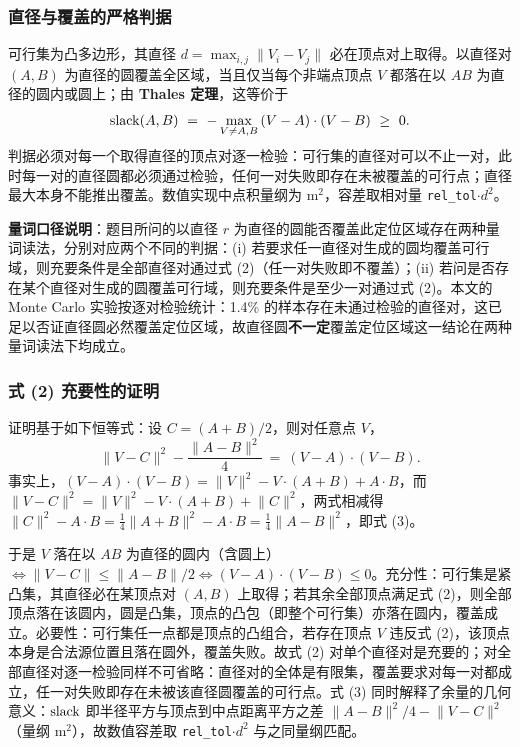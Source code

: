 \documentclass[12pt,a4paper]{ctexart}
\begin{document}
\subsubsection{直径与覆盖的严格判据}

可行集为凸多边形，其直径 $d=\max_{i,j}\lVert V_i-V_j\rVert$ 必在顶点对上取得。以直径对 $(A,B)$ 为直径的圆覆盖全区域，当且仅当每个非端点顶点 $V$ 都落在以 $AB$ 为直径的圆内或圆上；由 \textbf{Thales 定理}，这等价于
\begin{equation}
  \operatorname{slack}(A,B)\ =\ -\max_{V\neq A,B}\,(V-A)\cdot(V-B)\ \ge\ 0 .
\end{equation}
判据必须对每一个取得直径的顶点对逐一检验：可行集的直径对可以不止一对，此时每一对的直径圆都必须通过检验，任何一对失败即存在未被覆盖的可行点；直径最大本身不能推出覆盖。数值实现中点积量纲为 m$^2$，容差取相对量 \verb|rel_tol|$\cdot d^2$。

\textbf{量词口径说明}：题目所问的以直径 $r$ 为直径的圆能否覆盖此定位区域存在两种量词读法，分别对应两个不同的判据：(i) 若要求任一直径对生成的圆均覆盖可行域，则充要条件是全部直径对通过式 (2)（任一对失败即不覆盖）；(ii) 若问是否存在某个直径对生成的圆覆盖可行域，则充要条件是至少一对通过式 (2)。本文的 Monte Carlo 实验按逐对检验统计：1.4\% 的样本存在未通过检验的直径对，这已足以否证直径圆必然覆盖定位区域，故直径圆\textbf{不一定}覆盖定位区域这一结论在两种量词读法下均成立。

\subsubsection{式 (2) 充要性的证明}

证明基于如下恒等式：设 $C=(A+B)/2$，则对任意点 $V$，
\begin{equation}
  \lVert V-C\rVert^{2}-\frac{\lVert A-B\rVert^{2}}{4}\ =\ (V-A)\cdot(V-B).
\end{equation}
事实上，$(V-A)\cdot(V-B)=\lVert V\rVert^{2}-V\cdot(A+B)+A\cdot B$，而 $\lVert V-C\rVert^{2}=\lVert V\rVert^{2}-V\cdot(A+B)+\lVert C\rVert^{2}$，两式相减得 $\lVert C\rVert^{2}-A\cdot B=\tfrac14\lVert A+B\rVert^{2}-A\cdot B=\tfrac14\lVert A-B\rVert^{2}$，即式 (3)。

于是 $V$ 落在以 $AB$ 为直径的圆内（含圆上）$\iff \lVert V-C\rVert\le\lVert A-B\rVert/2 \iff (V-A)\cdot(V-B)\le 0$。充分性：可行集是紧凸集，其直径必在某顶点对 $(A,B)$ 上取得；若其余全部顶点满足式 (2)，则全部顶点落在该圆内，圆是凸集，顶点的凸包（即整个可行集）亦落在圆内，覆盖成立。必要性：可行集任一点都是顶点的凸组合，若存在顶点 $V$ 违反式 (2)，该顶点本身是合法源位置且落在圆外，覆盖失败。故式 (2) 对单个直径对是充要的；对全部直径对逐一检验同样不可省略：直径对的全体是有限集，覆盖要求对每一对都成立，任一对失败即存在未被该直径圆覆盖的可行点。式 (3) 同时解释了余量的几何意义：$\operatorname{slack}$ 即半径平方与顶点到中点距离平方之差 $\lVert A-B\rVert^{2}/4-\lVert V-C\rVert^{2}$（量纲 m$^2$），故数值容差取 \verb|rel_tol|$\cdot d^2$ 与之同量纲匹配。
\end{document}
